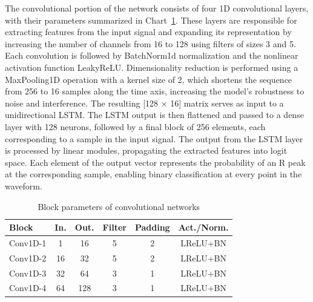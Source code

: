 \documentclass[journal]{IEEEtran}
\begin{document}
The convolutional portion of the network consists of four 1D convolutional layers, with their parameters summarized in Chart~\ref{tab:ecg_layers}. These layers are responsible for extracting features from the input signal and expanding its representation by increasing the number of channels from 16 to 128 using filters of sizes 3 and 5. Each convolution is followed by BatchNorm1d normalization and the nonlinear activation function LeakyReLU. Dimensionality reduction is performed using a MaxPooling1D operation with a kernel size of 2, which shortens the sequence from 256 to 16 samples along the time axis, increasing the model’s robustness to noise and interference. The resulting [128 × 16] matrix serves as input to a unidirectional LSTM. The LSTM output is then flattened and passed to a dense layer with 128 neurons, followed by a final block of 256 elements, each corresponding to a sample in the input signal. The output from the LSTM layer is processed by linear modules, propagating the extracted features into logit space. Each element of the output vector represents the probability of an R peak at the corresponding sample, enabling binary classification at every point in the waveform.

\begin{table}[h!]
\centering
\caption{Block parameters of convolutional networks}
\label{tab:ecg_layers}
\begin{tabular}{|l|c|c|c|c|c|}
\hline
\textbf{Block} & \textbf{In.} & \textbf{Out.} & \textbf{Filter} & \textbf{Padding} & \textbf{Act./Norm.} \\
\hline
Conv1D-1 & 1   & 16  & 5 & 2 & LReLU+BN \\
Conv1D-2 & 16  & 32  & 5 & 2 & LReLU+BN \\
Conv1D-3 & 32  & 64  & 3 & 1 & LReLU+BN \\
Conv1D-4 & 64  & 128 & 3 & 1 & LReLU+BN \\
\hline
\end{tabular}
\end{table}
\end{document}
